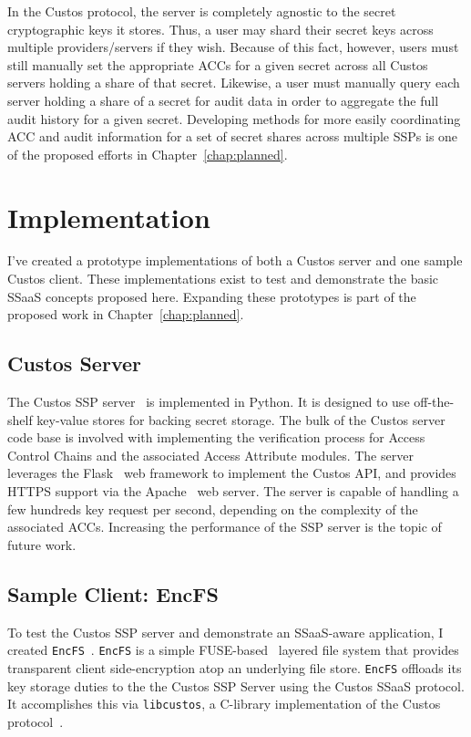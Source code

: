 In the Custos protocol, the server is completely agnostic to the
secret cryptographic keys it stores. Thus, a user may shard their
secret keys across multiple providers/servers if they wish. Because of
this fact, however, users must still manually set the appropriate ACCs
for a given secret across all Custos servers holding a share of that
secret. Likewise, a user must manually query each server holding a
share of a secret for audit data in order to aggregate the full audit
history for a given secret. Developing methods for more easily
coordinating ACC and audit information for a set of secret shares
across multiple SSPs is one of the proposed efforts in
Chapter~\ref{chap:planned}.

\section{Implementation}

I've created a prototype implementations of both a Custos server and
one sample Custos client. These implementations exist to test and
demonstrate the basic SSaaS concepts proposed here. Expanding these
prototypes is part of the proposed work in Chapter~\ref{chap:planned}.

\subsection{Custos Server}

The Custos SSP server~\cite{custos-repo-server} is implemented in
Python. It is designed to use off-the-shelf key-value stores for
backing secret storage. The bulk of the Custos server code base is
involved with implementing the verification process for Access Control
Chains and the associated Access Attribute modules. The server
leverages the Flask~\cite{python-flask} web framework to implement the
Custos API, and provides HTTPS support via the Apache~\cite{apache}
web server. The server is capable of handling a few hundreds key
request per second, depending on the complexity of the associated
ACCs. Increasing the performance of the SSP server is the topic of
future work.

\subsection{Sample Client: EncFS}

To test the Custos SSP server and demonstrate an SSaaS-aware
application, I created
\texttt{EncFS}~\cite{custos-repo-encfs}. \texttt{EncFS} is a simple
FUSE-based~\cite{fuse} layered file system that provides transparent
client side-encryption atop an underlying file store. \texttt{EncFS}
offloads its key storage duties to the the Custos SSP Server using the
Custos SSaaS protocol. It accomplishes this via \texttt{libcustos}, a
C-library implementation of the Custos
protocol~\cite{custos-repo-libcustos}.

